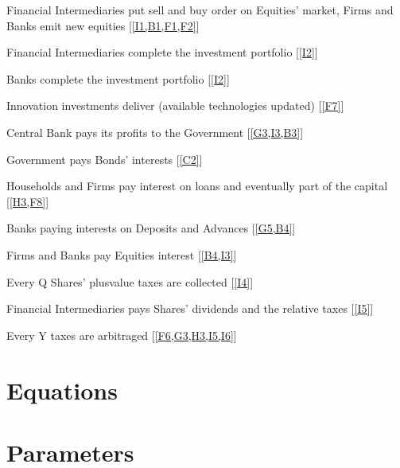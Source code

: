\documentclass[a4paper, headings=standardclasses]{scrartcl}
\begin{document}
\begin{steps}
	\item \label{I2} Financial Intermediaries put sell and buy order on Equities' market, Firms and Banks emit new equities [\cref{I1,B1,F1,F2}]
	\item \label{I3} Financial Intermediaries complete the investment portfolio [\cref{I2}]
	\item \label{B3} Banks complete the investment portfolio [\cref{I2}]
	\item \label{F9} Innovation investments deliver (available technologies updated) [\cref{F7}]
	\item \label{C2} Central Bank pays its profits to the Government [\cref{G3,I3,B3}]
	\item \label{G5} Government pays Bonds' interests [\cref{C2}]
	\item \label{B4} Households and Firms pay interest on loans and eventually part of the capital [\cref{H3,F8}]
	\item \label{B5} Banks paying interests on Deposits and Advances [\cref{G5,B4}]
	\item \label{I4} Firms and Banks pay Equities interest [\cref{B4,I3}]
	\item \label{I5} Every Q Shares' plusvalue taxes are collected [\cref{I4}]
	\item \label{I6} Financial Intermediaries pays Shares' dividends and the relative taxes [\cref{I5}]
	\item \label{G6} Every Y taxes are arbitraged [\cref{F6,G3,H3,I5,I6}]


\end{steps}

\section{Equations}

\section{Parameters}

\printbibliography
\end{document}
